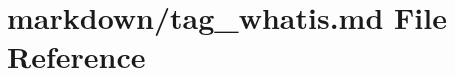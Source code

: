 \hypertarget{tag__whatis_8md}{}\section{markdown/tag\+\_\+whatis.md File Reference}
\label{tag__whatis_8md}
